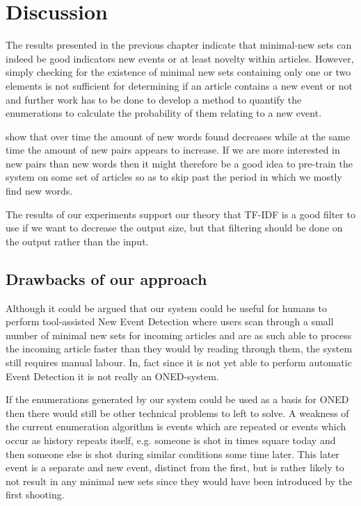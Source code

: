 \chapter{Discussion}
\label{chapter:discussion}
The results presented in the previous chapter indicate that minimal-new sets can indeed be good indicators new events or at least novelty within articles. However, simply checking for the existence of minimal new sets containing only one or two elements is not sufficient for determining if an article contains a new event or not and further work has to be done to develop a method to quantify the enumerations to calculate the probability of them relating to a new event.

 show that over time the amount of new words found decreases while at the same time the amount of new pairs appears to increase. If we are more interested in new pairs than new words then it might therefore be a good idea to pre-train the system on some set of articles so as to skip past the period in which we mostly find new words.

The results of our experiments support our theory that TF-IDF is a good filter to use if we want to decrease the output size, but that filtering should be done on the output rather than the input.

\section{Drawbacks of our approach}
Although it could be argued that our system could be useful for humans to perform tool-assisted New Event Detection where users scan through a small number of minimal new sets for incoming articles and are as such able to process the incoming article faster than they would by reading through them, the system still requires manual labour. In, fact since it is not yet able to perform automatic Event Detection it is not really an ONED-system.

If the enumerations generated by our system could be used as a basis for ONED then there would still be other technical problems to left to solve. 
A weakness of the current enumeration algorithm is events which are repeated or events which occur as history repeats itself, e.g. someone is shot in times square today and then someone else is shot during similar conditions some time later. This later event is a separate and new event, distinct from the first, but is rather likely to not result in any minimal new sets since they would have been introduced by the first shooting.

